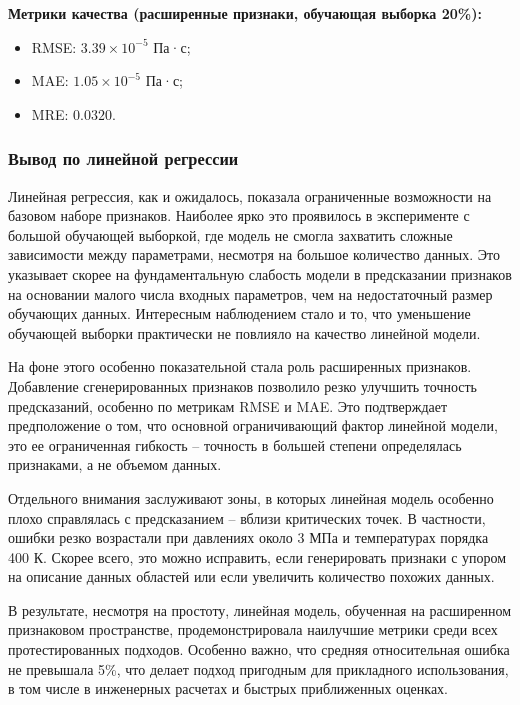 \documentclass[a4paper,12pt]{article}
\begin{document}
    \vspace{5mm}
    \begin{minipage}{\textwidth}
      \textbf{Метрики качества (расширенные признаки, обучающая выборка 20\%):}
      \begin{itemize}
          \item RMSE: \( 3.39 \times 10^{-5} \) Па·с;
          \item MAE: \( 1.05 \times 10^{-5} \) Па·с;
          \item MRE: \( 0.0320 \).
      \end{itemize}
    \end{minipage}

    \subsubsection{Вывод по линейной регрессии}

      Линейная регрессия, как и ожидалось, показала ограниченные возможности на базовом наборе признаков. Наиболее ярко это проявилось в эксперименте с большой обучающей выборкой, где модель не смогла захватить сложные зависимости между параметрами, несмотря на большое количество данных. Это указывает скорее на фундаментальную слабость модели в предсказании признаков на основании малого числа входных параметров, чем на недостаточный размер обучающих данных. Интересным наблюдением стало и то, что уменьшение обучающей выборки практически не повлияло на качество линейной модели.

      На фоне этого особенно показательной стала роль расширенных признаков. Добавление сгенерированных признаков позволило резко улучшить точность предсказаний, особенно по метрикам RMSE и MAE. Это подтверждает предположение о том, что основной ограничивающий фактор линейной модели, это ее ограниченная гибкость -- точность в большей степени определялась признаками, а не объемом данных.
      
      Отдельного внимания заслуживают зоны, в которых линейная модель особенно плохо справлялась с предсказанием -- вблизи критических точек. В частности, ошибки резко возрастали при давлениях около 3 МПа и температурах порядка 400 К. Скорее всего, это можно исправить, если генерировать признаки с упором на описание данных областей или если увеличить количество похожих данных.
      
      В результате, несмотря на простоту, линейная модель, обученная на расширенном признаковом пространстве, продемонстрировала наилучшие метрики среди всех протестированных подходов. Особенно важно, что средняя относительная ошибка не превышала 5\%, что делает подход пригодным для прикладного использования, в том числе в инженерных расчетах и быстрых приближенных оценках.
\end{document}
